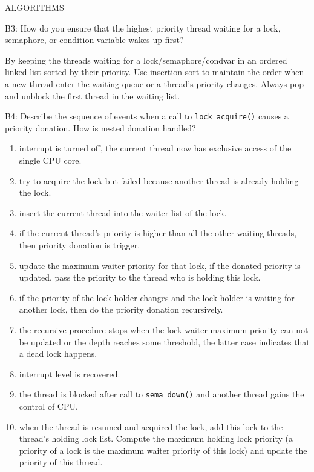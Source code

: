 \begin{aspect}{ALGORITHMS}
	\begin{qc}
		B3: How do you ensure that the highest priority thread waiting for a lock, semaphore, or condition variable wakes up first?
	\end{qc}

	By keeping the threads waiting for a lock/semaphore/condvar in an ordered linked list sorted by their priority.
	Use insertion sort to maintain the order when a new thread enter the waiting queue or a thread's priority changes.
	Always pop and unblock the first thread in the waiting list.

	\begin{qc}
		B4: Describe the sequence of events when a call to \lstinline{lock_acquire()} causes a priority donation.
		How is nested donation handled?
	\end{qc}

	\begin{enumerate}
		\item interrupt is turned off, the current thread now has exclusive access of the single CPU core.
		\item try to acquire the lock but failed because another thread is already holding the lock.
		\item insert the current thread into the waiter list of the lock.
		\item if the current thread's priority is higher than all the other waiting threads, then priority donation is trigger.
		\item update the maximum waiter priority for that lock, if the donated priority is updated,
		      pass the priority to the thread who is holding this lock.
		\item if the priority of the lock holder changes and the lock holder is waiting for another lock,
		      then do the priority donation recursively.
		\item the recursive procedure stops when the lock waiter maximum priority can not be updated or the depth reaches some threshold,
		      the latter case indicates that a dead lock happens.
		\item interrupt level is recovered.
		\item the thread is blocked after call to \lstinline{sema_down()} and another thread gains the control of CPU.
		\item when the thread is resumed and acquired the lock,
		      add this lock to the thread's holding lock list.
		      Compute the maximum holding lock priority (a priority of a lock is the maximum waiter priority of this lock) and update the priority of this thread.
	\end{enumerate}


\end{aspect}
